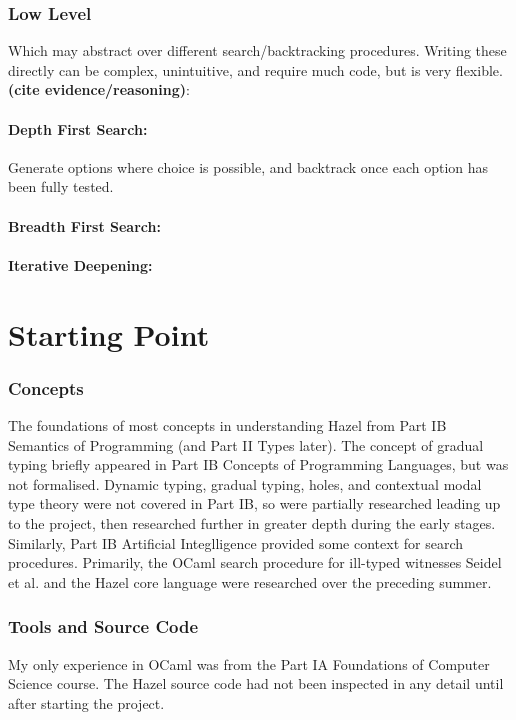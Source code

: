 \subsubsection{Low Level}
Which may abstract over different search/backtracking procedures. Writing these directly can be complex, unintuitive, and require much code, but is very flexible. \textbf{(cite evidence/reasoning)}:
\paragraph{Depth First Search:} 
Generate options where choice is possible, and backtrack once each option has been fully tested.
\paragraph{Breadth First Search:}
\paragraph{Iterative Deepening:}




\section{Starting Point}\label{sec:StartingPoint}
\subsubsection{Concepts}
The foundations of most concepts in understanding Hazel from Part IB Semantics of Programming (and Part II Types later). The concept of gradual typing briefly appeared in Part IB Concepts of Programming Languages, but was not formalised. Dynamic typing, gradual typing, holes, and contextual modal type theory were not covered in Part IB, so were partially researched leading up to the project, then researched further in greater depth during the early stages. Similarly, Part IB Artificial Integlligence provided some context for search procedures. Primarily, the OCaml search procedure for ill-typed witnesses Seidel et al. \cite{SearchProc} and the Hazel core language \cite{HazelLivePaper} were researched over the preceding summer.

\subsubsection{Tools and Source Code}
My only experience in OCaml was from the Part IA Foundations of Computer Science course. The Hazel source code had not been inspected in any detail until after starting the project.

